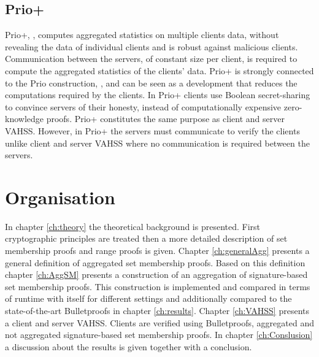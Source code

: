 \subsection*{Prio+}
Prio+, \cite{prioPlus}, computes aggregated statistics on multiple clients data, without revealing the data of individual clients and is robust against malicious clients.  Communication between the servers, of constant size per client, is required to compute the aggregated statistics of the clients' data. Prio+ is strongly connected to the Prio construction, \cite{prio}, and can be seen as a development that reduces the computations required by the clients. In Prio+ clients use Boolean secret-sharing to convince servers of their honesty, instead of computationally expensive zero-knowledge proofs.  Prio+ constitutes the same purpose as client and server VAHSS. However, in Prio+ the servers must communicate to verify the clients unlike client and server VAHSS where no communication is required between the servers.


\section*{Organisation}
In chapter \ref{ch:theory} the theoretical background is presented. First cryptographic principles are treated then a more detailed description of set membership proofs and range proofs is given. Chapter \ref{ch:generalAgg} presents a general definition of aggregated set membership proofs. Based on this definition chapter \ref{ch:AggSM} presents a construction of an aggregation of signature-based set membership proofs. This construction is implemented and compared in terms of runtime with itself for different settings and additionally compared to the state-of-the-art Bulletproofs in chapter \ref{ch:results}. Chapter \ref{ch:VAHSS} presents a client and server VAHSS. Clients are verified using Bulletproofs, aggregated and not aggregated signature-based set membership proofs. In chapter \ref{ch:Conslusion} a discussion about the results is given together with a conclusion.



